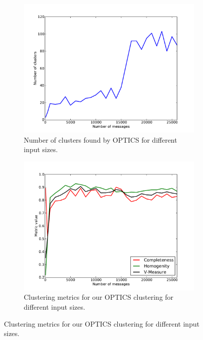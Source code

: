 \documentclass[a4paper]{report}
\begin{document}
\begin{figure}[h]
    \centering
    \begin{subfigure}[t]{0.48\textwidth}
        \includegraphics[width=\textwidth]{num_optics}
        \caption{Number of clusters found by OPTICS for different input sizes.}
        \label{fig:num_optics}
    \end{subfigure}
    \quad
    \begin{subfigure}[t]{0.48\textwidth}
        \includegraphics[width=\textwidth]{metrics_optics}
        \caption{Clustering metrics for our OPTICS clustering for different
            input sizes.}
        \label{fig:metrics_optics}
    \end{subfigure}
    \label{fig:optics_res}
\end{figure}
\end{document}
